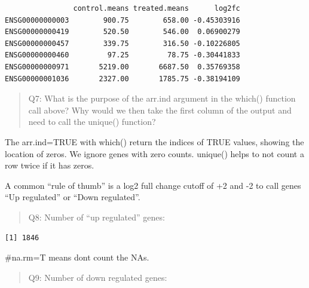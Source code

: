 \documentclass[
  letterpaper,
  DIV=11,
  numbers=noendperiod]{scrartcl}
\newenvironment{Shaded}{\begin{snugshade}}{\end{snugshade}}
\newcommand{\AttributeTok}[1]{\textcolor[rgb]{0.40,0.45,0.13}{#1}}
\newcommand{\CommentTok}[1]{\textcolor[rgb]{0.37,0.37,0.37}{#1}}
\newcommand{\DecValTok}[1]{\textcolor[rgb]{0.68,0.00,0.00}{#1}}
\newcommand{\FunctionTok}[1]{\textcolor[rgb]{0.28,0.35,0.67}{#1}}
\newcommand{\NormalTok}[1]{\textcolor[rgb]{0.00,0.23,0.31}{#1}}
\newcommand{\SpecialCharTok}[1]{\textcolor[rgb]{0.37,0.37,0.37}{#1}}
\begin{document}
\begin{verbatim}
                control.means treated.means      log2fc
ENSG00000000003        900.75        658.00 -0.45303916
ENSG00000000419        520.50        546.00  0.06900279
ENSG00000000457        339.75        316.50 -0.10226805
ENSG00000000460         97.25         78.75 -0.30441833
ENSG00000000971       5219.00       6687.50  0.35769358
ENSG00000001036       2327.00       1785.75 -0.38194109
\end{verbatim}

\begin{quote}
Q7: What is the purpose of the arr.ind argument in the which() function
call above? Why would we then take the first column of the output and
need to call the unique() function?
\end{quote}

The arr.ind=TRUE with which() return the indices of TRUE values, showing
the location of zeros. We ignore genes with zero counts. unique() helps
to not count a row twice if it has zeros.

A common ``rule of thumb'' is a log2 full change cutoff of +2 and -2 to
call genes ``Up regulated'' or ``Down regulated''.

\begin{quote}
Q8: Number of ``up regulated'' genes:
\end{quote}

\begin{Shaded}
\end{Shaded}

\begin{verbatim}
[1] 1846
\end{verbatim}

\begin{Shaded}
\begin{Highlighting}[]
\CommentTok{\#na.rm=T means don\textquotesingle{}t count the NAs.}
\end{Highlighting}
\end{Shaded}

\begin{quote}
Q9: Number of down regulated genes:
\end{quote}

\begin{Shaded}
\end{Shaded}
\end{document}

